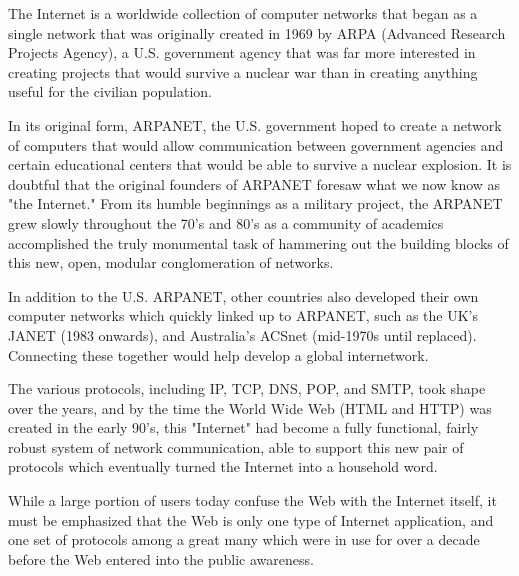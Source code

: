 The Internet is a worldwide collection of computer networks that began as a single network that was originally created in 1969 by ARPA (Advanced Research Projects Agency), a U.S. government agency that was far more interested in creating projects that would survive a nuclear war than in creating anything useful for the civilian population.

In its original form, ARPANET, the U.S. government hoped to create a network of computers that would allow communication between government agencies and certain educational centers that would be able to survive a nuclear explosion. It is doubtful that the original founders of ARPANET foresaw what we now know as "the Internet." From its humble beginnings as a military project, the ARPANET grew slowly throughout the 70's and 80's as a community of academics accomplished the truly monumental task of hammering out the building blocks of this new, open, modular conglomeration of networks.

In addition to the U.S. ARPANET, other countries also developed their own computer networks which quickly linked up to ARPANET, such as the UK's JANET (1983 onwards), and Australia's ACSnet (mid-1970s until replaced). Connecting these together would help develop a global internetwork.

The various protocols, including IP, TCP, DNS, POP, and SMTP, took shape over the years, and by the time the World Wide Web (HTML and HTTP) was created in the early 90's, this "Internet" had become a fully functional, fairly robust system of network communication, able to support this new pair of protocols which eventually turned the Internet into a household word.

While a large portion of users today confuse the Web with the Internet itself, it must be emphasized that the Web is only one type of Internet application, and one set of protocols among a great many which were in use for over a decade before the Web entered into the public awareness.
